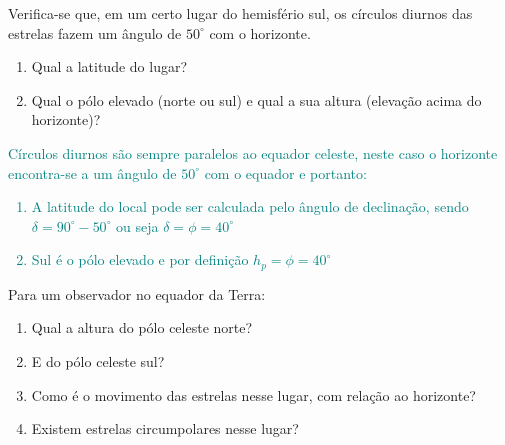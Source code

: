\begin{prob}
	Verifica-se que, em um certo lugar do hemisfério sul, os círculos diurnos das estrelas fazem um
	ângulo de $50^{\circ}$ com o horizonte.
	\begin{enumerate}[label=\alph *)]
		\item Qual a latitude do lugar?
		\item Qual o pólo elevado (norte ou sul) e qual a sua altura (elevação acima do horizonte)?
	\end{enumerate}
\end{prob}

\begin{sol}
	\textcolor{teal} {
		Círculos diurnos são sempre paralelos ao equador celeste, neste caso o horizonte encontra-se a um ângulo de $50^{\circ}$ com o equador e portanto:
		\begin{enumerate}[label=\alph *)]
			\item A latitude do local pode ser calculada pelo ângulo de declinação, sendo $\delta=90^{\circ}-50^{\circ}$ ou seja $\delta=\phi=40^{\circ}$
			\item Sul é o pólo elevado e por definição $h_p=\phi=40^{\circ}$
		\end{enumerate}
	}
\end{sol}
\begin{prob}
	Para um observador no equador da Terra:
	\begin{enumerate}[label=\alph *)]
		\item Qual a altura do pólo celeste norte?
		\item E do pólo celeste sul?
		\item Como é o movimento das estrelas nesse lugar, com relação ao horizonte?
		\item Existem estrelas circumpolares nesse lugar?
	\end{enumerate}
\end{prob}

